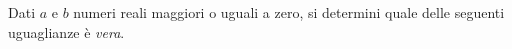 Dati $a$ e $b$  numeri reali maggiori o uguali a zero, %
si determini quale delle seguenti uguaglianze è \emph{vera}.